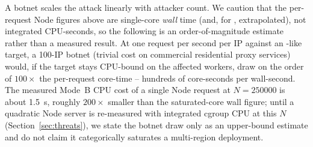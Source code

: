 A botnet scales the attack linearly with attacker count. We
caution that the per-request Node figures above are single-core
\emph{wall} time (and, for , extrapolated), not
integrated CPU-seconds, so the following is an order-of-magnitude
estimate rather than a measured result. At one request per second
per IP against an -like target, a 100-IP botnet
(trivial cost on commercial residential proxy services) would, if
the target stays CPU-bound on the affected workers, draw on the
order of $100\times$ the per-request core-time -- hundreds of
core-seconds per wall-second. The measured Mode~B CPU cost of a
single Node  request at $N{=}\num{250000}$ is
about \SI{1.5}{\second}, roughly $200\times$ smaller than the
saturated-core wall figure; until a quadratic Node server is
re-measured with integrated cgroup CPU at this $N$
(Section~\ref{sec:threats}), we state the botnet draw only as an
upper-bound estimate and do not claim it categorically saturates a
multi-region deployment.
